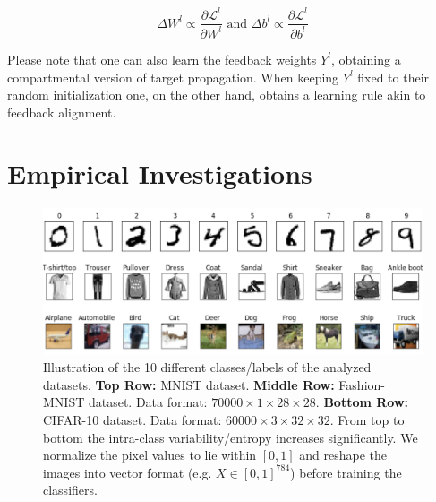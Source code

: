 \documentclass[colorinlistoftodos]{article}
\theoremstyle{definition}
\begin{document}
$$\Delta W^l \propto \frac{\partial \mathcal{L}^l}{\partial W^l} \text{  and  } \Delta b^l \propto \frac{\partial \mathcal{L}^l}{\partial b^l}$$

Please note that one can also learn the feedback weights $Y^l$, obtaining a compartmental version of target propagation. When keeping $Y^l$ fixed to their random initialization one, on the other hand, obtains a learning rule akin to feedback alignment.

\newpage
\section{Empirical Investigations}

\begin{figure}[H]
	\centering
	\includegraphics[width=\textwidth]{../figures/report/datasets}
	\caption{Illustration of the 10 different classes/labels of the analyzed datasets. \textbf{Top Row:} MNIST dataset. \textbf{Middle Row:} Fashion-MNIST dataset. Data format: $70000 \times 1 \times 28 \times 28$. \textbf{Bottom Row:} CIFAR-10 dataset. Data format: $60000 \times 3 \times 32 \times 32$. From top to bottom the intra-class variability/entropy increases significantly. We normalize the pixel values to lie within $[0, 1]$ and reshape the images into vector format (e.g. $X \in [0, 1]^{784}$) before training the classifiers.}	\label{fig:data}
\end{figure}
\end{document}
